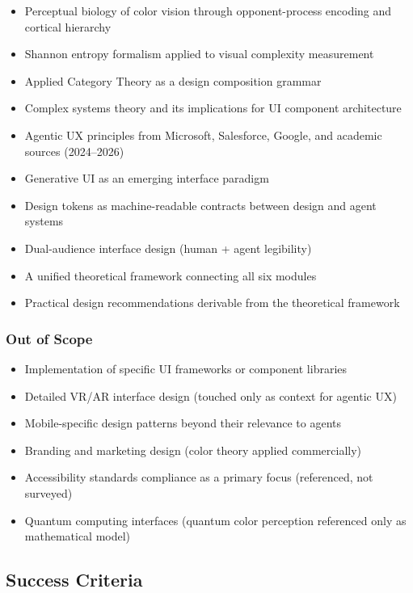 \documentclass[11pt,letterpaper]{article}
\begin{document}
\begin{itemize}[itemsep=0.3em]
  \item Perceptual biology of color vision through opponent-process encoding and cortical hierarchy
  \item Shannon entropy formalism applied to visual complexity measurement
  \item Applied Category Theory as a design composition grammar
  \item Complex systems theory and its implications for UI component architecture
  \item Agentic UX principles from Microsoft, Salesforce, Google, and academic sources (2024--2026)
  \item Generative UI as an emerging interface paradigm
  \item Design tokens as machine-readable contracts between design and agent systems
  \item Dual-audience interface design (human + agent legibility)
  \item A unified theoretical framework connecting all six modules
  \item Practical design recommendations derivable from the theoretical framework
\end{itemize}

\subsubsection{Out of Scope}

\begin{itemize}[itemsep=0.3em]
  \item Implementation of specific UI frameworks or component libraries
  \item Detailed VR/AR interface design (touched only as context for agentic UX)
  \item Mobile-specific design patterns beyond their relevance to agents
  \item Branding and marketing design (color theory applied commercially)
  \item Accessibility standards compliance as a primary focus (referenced, not surveyed)
  \item Quantum computing interfaces (quantum color perception referenced only as mathematical model)
\end{itemize}

\subsection{Success Criteria}
\end{document}
